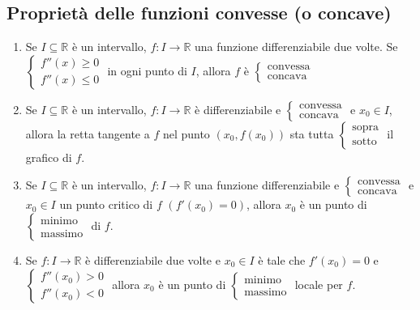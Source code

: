 \documentclass[a4paper]{article}
\theoremstyle{break}
\theoremstyle{break}
\theoremstyle{break}
\theoremstyle{break}
\begin{document}
\subsection{Proprietà delle funzioni convesse (o concave)}
\begin{enumerate}
  \item Se \( I \subseteq \mathbb{R} \) è un intervallo, \( f: I \to \mathbb{R} \) 
    una funzione differenziabile due volte. Se \( \begin{cases}
    f''(x) \ge 0\\
    f''(x) \le 0
  \end{cases} \) in ogni punto di \( I \), allora \( f \) è \( \begin{cases}
    \text{convessa}\\
    \text{concava}
  \end{cases} \) 
  \item Se \( I \subseteq \mathbb{R} \) è un intervallo, \( f: I \to \mathbb{R} \) è
    differenziabile e \( \begin{cases}
      \text{convessa}\\
      \text{concava}
    \end{cases} \) e \( x_0 \in I \), allora la retta tangente a \( f \) nel
    punto \( (x_0, f(x_0)) \) sta tutta \( \begin{cases}
      \text{sopra}\\
      \text{sotto}
    \end{cases} \) il grafico di \( f \). 
    \label{D7}
  \item Se \( I \subseteq \mathbb{R} \) è un intervallo, \( f: I \to \mathbb{R} \) una
    funzione differenziabile e \( \begin{cases}
      \text{convessa}\\
      \text{concava}
    \end{cases} \) e \( x_0 \in I \) un punto critico di \( f \) \( (f'(x_0)=0) \),
    allora \( x_0 \) è un punto di \( \begin{cases}
      \text{minimo}\\
      \text{massimo}
    \end{cases} \) di \( f \).
    \label{D8}
    \label{D9}
  \item Se \( f:I \to \mathbb{R} \) è differenziabile due volte e \( x_0 \in I \) è
    tale che \( f'(x_0) = 0 \) e \( \begin{cases}
      f''(x_0) > 0\\
      f''(x_0) < 0
    \end{cases} \) allora \( x_0 \) è un punto di \( \begin{cases}
      \text{minimo}\\
      \text{massimo}
    \end{cases} \) locale per \( f \).
\end{enumerate}
\end{document}
